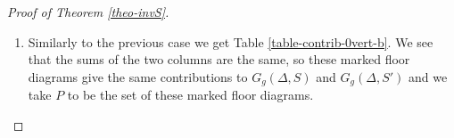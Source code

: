 \documentclass[11pt]{article}
\theoremstyle{definition}
\numberwithin{equation}{section}
\theoremstyle{plain}
\begin{document}
\begin{proof}[Proof of Theorem \ref{theo-invS}]
\begin{enumerate}[label=(\alph*)]
\begin{table}[ht]
\renewcommand{\arraystretch}{1.5}
\centering
\[ 
\begin{array}{|c||c|c|}
\hline
  & S  & S' \\
\hline
\hline
(i,i+1,i+2) & \dfrac{[\omega_1][\omega_2][\omega_1 + \omega_2]}{[2]} [\omega_3]^2 & \dfrac{[\omega_2][\omega_3][\omega_2 + \omega_3]}{[2]} [\omega_1]^2  \\
\hline 
(i,i+2,i+1) & \dfrac{[\omega_1][\omega_3][\omega_1 + \omega_3]}{[2]} [\omega_2]^2 & \dfrac{[\omega_2][\omega_3][\omega_2 + \omega_3]}{[2]} [\omega_1]^2   \\
\hline 
(i+1,i,i+2) & \dfrac{[\omega_1][\omega_2][\omega_1 + \omega_2]}{[2]} [\omega_3]^2 & \dfrac{[\omega_1][\omega_3][\omega_1 + \omega_3]}{[2]} [\omega_2]^2    \\
\hline 
(i+1,i+2,i) & \dfrac{[\omega_1][\omega_3][\omega_1 + \omega_3]}{[2]} [\omega_2]^2 & \dfrac{[\omega_1][\omega_2][\omega_1 + \omega_2]}{[2]} [\omega_3]^2   \\
\hline 
(i+2,i,i+1) & \dfrac{[\omega_2][\omega_3][\omega_2 + \omega_3]}{[2]} [\omega_1]^2 & \dfrac{[\omega_1][\omega_3][\omega_1 + \omega_3]}{[2]} [\omega_2]^2   \\
\hline 
(i+2,i+1,i) & \dfrac{[\omega_2][\omega_3][\omega_2 + \omega_3]}{[2]} [\omega_1]^2 & \dfrac{[\omega_1][\omega_2][\omega_1 + \omega_2]}{[2]} [\omega_3]^2    \\
\hline 
\end{array} \]
\caption{Contribution of the markings in case (a).}
\label{table-contrib-0vert-a}
\end{table}


 Note that depending on the unshown part of the diagram and on the precise value of the weights, some markings may give isomorphic marked diagrams: there may be only 3 or 1 marked floor diagrams instead of 6. However, in that case some of the weights among $\omega_1$, $\omega_2$ and $\omega_3$ are equal, and removing the superfluous rows if the table does not affect the equality of the sums of the columns.


\item Similarly to the previous case we get Table \ref{table-contrib-0vert-b}. We see that the sums of the two columns are the same, so these marked floor diagrams give the same contributions to $G_g(\Delta,S)$ and $G_g(\Delta,S')$ and we take $P$ to be the set of these marked floor diagrams.


\end{enumerate}
\end{proof}
\end{document}

